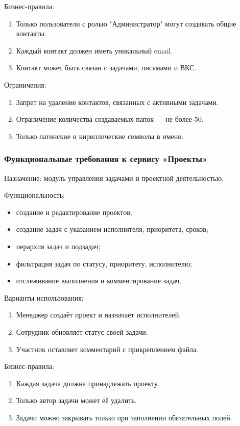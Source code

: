 Бизнес-правила:
\begin{enumerate}
  \item Только пользователи с ролью "Администратор" могут создавать общие контакты.
  \item Каждый контакт должен иметь уникальный email.
  \item Контакт может быть связан с задачами, письмами и ВКС.
\end{enumerate}

Ограничения:
\begin{enumerate}
  \item Запрет на удаление контактов, связанных с активными задачами.
  \item Ограничение количества создаваемых папок — не более 50.
  \item Только латинские и кириллические символы в имени.
\end{enumerate}

\subsubsection{Функциональные требования к сервису «Проекты»}

Назначение: модуль управления задачами и проектной деятельностью.

Функциональность:
\begin{itemize}
  \item создание и редактирование проектов;
  \item создание задач с указанием исполнителя, приоритета, сроков;
  \item иерархия задач и подзадач;
  \item фильтрация задач по статусу, приоритету, исполнителю;
  \item отслеживание выполнения и комментирование задач.
\end{itemize}

Варианты использования:
\begin{enumerate}
  \item Менеджер создаёт проект и назначает исполнителей.
  \item Сотрудник обновляет статус своей задачи.
  \item Участник оставляет комментарий с прикреплением файла.
\end{enumerate}

Бизнес-правила:
\begin{enumerate}
  \item Каждая задача должна принадлежать проекту.
  \item Только автор задачи может её удалить.
  \item Задачи можно закрывать только при заполнении обязательных полей.
\end{enumerate}

